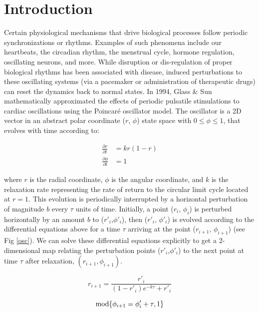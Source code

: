 \setlength{\parindent}{2em}

\section{Introduction}
\indent Certain physiological mechanisms that drive biological processes follow periodic synchronizations or rhythms. Examples of such phenomena include our heartbeats, the circadian rhythm, the menstrual cycle, hormone regulation, oscillating neurons, and more. While disruption or dis-regulation of proper biological rhythms has been associated with disease, induced perturbations to these oscillating systems (via a pacemaker or administration of therapeutic drugs) can reset the dynamics back to normal states\supercite{Glass2001}. 
\indent In 1994, Glass \& Sun\supercite{GLASS1994} mathematically approximated the effects of periodic pulsatile stimulations to cardiac oscillations using the Poincaré oscillator model. The oscillator is a 2D vector in an abstract  polar coordinate ($r$, $\phi$) state space with $0\leq \phi \leq 1$, that evolves with time according to:

\begin{align}
   \frac{\partial r}{\partial t} &= kr(1-r)\\ 
   \frac{\partial \phi}{\partial t}&=1
\end{align}

\noindent where $r$ is the radial coordinate, $\phi$ is the angular coordinate, and $k$ is the relaxation rate representing the rate of return to the circular limit cycle located at $r=1$. This evolution is periodically interrupted by a horizontal perturbation of magnitude $b$ every $\tau$ units of time. Initially, a point ($r_i$, $\phi_i$) is perturbed horizontally by an amount $b$ to ($r'_i$,$\phi'_i$), then ($r'_i$, $\phi'_i$) is evolved according to the differential equations above for a time $\tau$ arriving at the point ($r_{i+1}$, $\phi_{i+1}$) (see Fig \ref{osc}). We can solve these differential equations explicitly to get a 2-dimensional map relating the  perturbation points ($r'_i$,$\phi'_i$) to the next point at time $\tau$ after relaxation, $(r_{i+1}, \phi_{i+1})$.

\begin{equation}
    r_{i+1} = \frac{r'_i}{(1 - r'_i)e^{-k\tau}+r'_i}
    \label{eqn:1}
\end{equation}

\begin{equation}
    \textnormal{mod} \{\phi_{i+1} = \phi_i' + \tau,1\}
    \label{eqn:2}
\end{equation}

